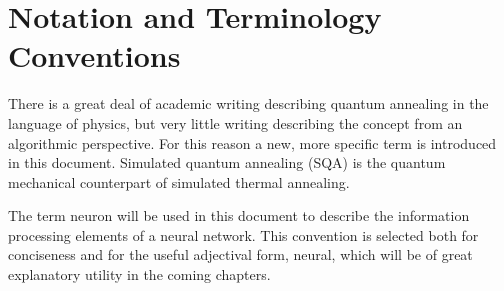 \documentclass[11pt]{afthesis}
\begin{document}
	
	
	
	
	
	
	
	\section{Notation and Terminology Conventions}
	
	There is a great deal of academic writing describing quantum annealing in the language of physics, but very little writing describing the concept from an algorithmic perspective. For this reason a new, more specific term is introduced in this document. Simulated quantum annealing (SQA) is the quantum mechanical counterpart of simulated thermal annealing. 
	
	
	The term neuron will be used in this document to describe the information processing elements of a neural network. This convention is selected both for conciseness and for the useful adjectival form, neural, which will be of great explanatory utility in the coming chapters.
	
\end{document}
